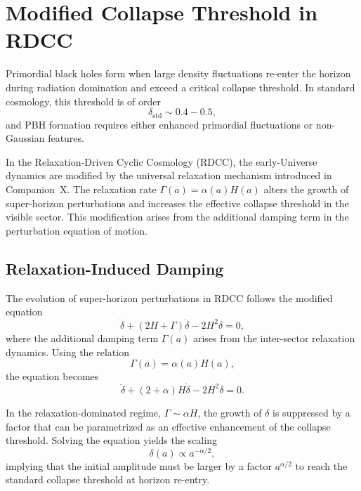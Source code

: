 \documentclass[11pt,a4paper]{article}
\begin{document}

\section{Modified Collapse Threshold in RDCC}

Primordial black holes form when large density fluctuations re-enter the horizon during
radiation domination and exceed a critical collapse threshold. In standard cosmology, this
threshold is of order
\begin{equation}
\delta_{\mathrm{std}} \sim 0.4 - 0.5,
\end{equation}
and PBH formation requires either enhanced primordial fluctuations or non-Gaussian features.

In the Relaxation-Driven Cyclic Cosmology (RDCC), the early-Universe dynamics are modified
by the universal relaxation mechanism introduced in Companion~X. The relaxation rate
\(\Gamma(a) = \alpha(a) H(a)\) alters the growth of super-horizon perturbations and increases the
effective collapse threshold in the visible sector. This modification arises from the additional
damping term in the perturbation equation of motion.


\subsection{Relaxation-Induced Damping}

The evolution of super-horizon perturbations in RDCC follows the modified equation
\begin{equation}
\ddot{\delta} + (2H + \Gamma)\dot{\delta} - 2H^{2}\delta = 0,
\end{equation}
where the additional damping term \(\Gamma(a)\) arises from the inter-sector relaxation dynamics.
Using the relation
\begin{equation}
\Gamma(a) = \alpha(a) H(a),
\end{equation}
the equation becomes
\begin{equation}
\ddot{\delta} + (2 + \alpha)H\dot{\delta} - 2H^{2}\delta = 0.
\end{equation}

In the relaxation-dominated regime, \(\Gamma \sim \alpha H\), the growth of \(\delta\) is suppressed by a
factor that can be parametrized as an effective enhancement of the collapse threshold. Solving
the equation yields the scaling
\begin{equation}
\delta(a) \propto a^{-\alpha/2},
\end{equation}
implying that the initial amplitude must be larger by a factor \(a^{\alpha/2}\) to reach the standard
collapse threshold at horizon re-entry.
\end{document}
